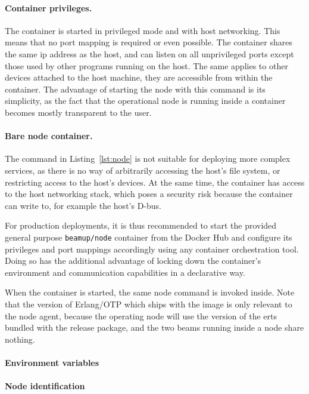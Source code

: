 \paragraph{Container privileges.}
The container is started in privileged mode and with host networking. This means that no port mapping is required or even possible. The container shares the same \acrshort{ip} address as the host, and can listen on all unprivileged ports except those used by other programs running on the host. The same applies to other devices attached to the host machine, they are accessible from within the container. The advantage of starting the node with this command is its simplicity, as the fact that the operational node is running inside a container becomes mostly transparent to the user.

\paragraph{Bare node container.}
The command in Listing~\ref{lst:node} is not suitable for deploying more complex services, as there is no way of arbitrarily accessing the host's file system, or restricting access to the host's devices. At the same time, the container has access to the host networking stack, which poses a security risk because the container can write to, for example the host's D-bus.~\cite{docker:docs}

For production deployments, it is thus recommended to start the provided general purpose \lstinline|beamup/node| container from the Docker Hub and configure its privileges and port mappings accordingly using any container orchestration tool. Doing so has the additional advantage of locking down the container's environment and communication capabilities in a declarative way.

When the container is started, the same node command is invoked inside. Note that the version of Erlang/OTP which ships with the image is only relevant to the node agent, because the operating node will use the version of the \acrshort{erts} bundled with the release package, and the two \acrshort{beam}s running inside a node share nothing.

\paragraph{Environment variables}

\paragraph{Node identification}


